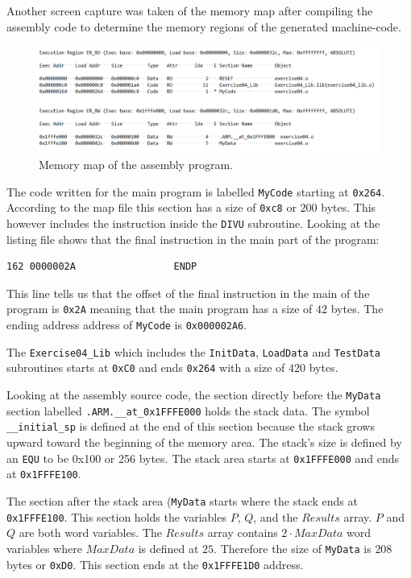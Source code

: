 \documentclass[\FontSize\FontUnit,letterpaper,oneside]{article}
\def\code#1{\texttt{#1}}
\begin{document}
Another screen capture was taken of the memory map after compiling the
assembly code to determine the memory regions of the generated machine-code.

\begin{figure}[h!]
	\centering
	\includegraphics[width=\textwidth]{cap2}
	\caption{Memory map of the assembly program.}
	\label{fig:capture2}
\end{figure}

The code written for the main program is labelled \code{MyCode} starting
at \code{0x264}. According to the map file this section has a size of \code{0xc8} or $200$ bytes. This however includes the instruction inside
the \code{DIVU} subroutine. Looking at the listing file shows that the 
final instruction in the main part of the program:

\begin{lstlisting}
162 0000002A                 ENDP
\end{lstlisting}

This line tells us that the offset of the final instruction in the main
of the program is \code{0x2A} meaning that the main program has a size of
$42$ bytes. The ending address address of \code{MyCode} is
\code{0x000002A6}.

The \code{Exercise04\_Lib} which includes the \code{InitData}, 
\code{LoadData} and \code{TestData} subroutines starts at \code{0xC0}
and ends \code{0x264} with a size of $420$ bytes. 

Looking at the assembly source code, the section directly before the 
\code{MyData} section labelled \code{.ARM.\_\_at\_0x1FFFE000} holds the
stack data. The symbol \code{\_\_initial\_sp} is defined at the end of this
section because the stack grows upward toward the beginning of the memory
area. The stack's size is defined by an \code{EQU} to be 0x100 or 256 bytes.
The stack area starts at \code{0x1FFFE000} and ends at \code{0x1FFFE100}.

The section after the stack area (\code{MyData} starts where the stack 
ends at \code{0x1FFFE100}. This section holds the variables $P$, $Q$, 
and the $Results$ array. $P$ and $Q$ are both word variables. The 
$Results$ array contains $2 \cdot MaxData$ word variables where $MaxData$
is defined at $25$. Therefore the size of \code{MyData} is $208$ bytes
or \code{0xD0}. This section ends at the \code{0x1FFFE1D0} address.
\end{document}
